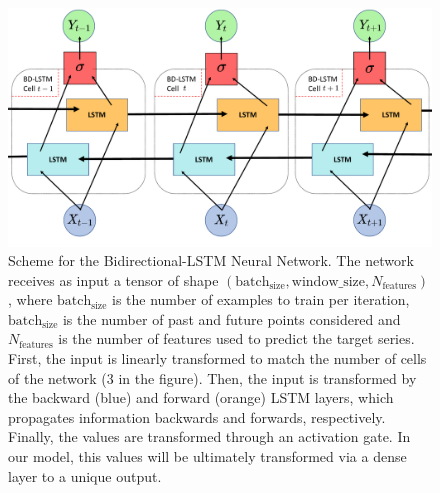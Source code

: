 \begin{figure}[H]
    \centering
    \includegraphics[width=\textwidth]{Figures/BD_LSTM_scheme.pdf}
    \caption{Scheme for the Bidirectional-LSTM Neural Network. The network
        receives as input a tensor of shape $(\textrm{batch}_\textrm{size},
            \textrm{window}\_\textrm{size}, N_{\textrm{features}})$, where
        $\textrm{batch}_\textrm{size}$ is the number of examples to train per
        iteration, $\textrm{batch}_\textrm{size}$ is the number of past and
        future
        points considered and $N_{\textrm{features}}$ is the number of features
        used to
        predict the target series. First, the input is linearly transformed to
        match
        the number of cells of the network (3 in the figure). Then, the input
        is
        transformed by the backward (blue) and forward (orange) LSTM layers,
        which
        propagates information backwards and forwards, respectively. Finally,
        the
        values are transformed through an activation gate. In our model, this
        values
        will be ultimately transformed via a dense layer to a unique output.}
    \label{fig:BD_LSTM_scheme}
\end{figure}
